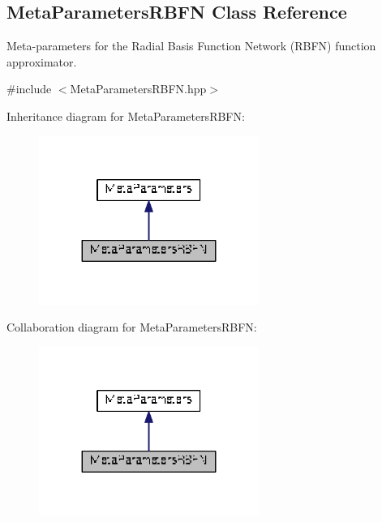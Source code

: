 \hypertarget{classDmpBbo_1_1MetaParametersRBFN}{\subsection{Meta\+Parameters\+R\+B\+F\+N Class Reference}
\label{classDmpBbo_1_1MetaParametersRBFN}
}


Meta-\/parameters for the Radial Basis Function Network (R\+B\+F\+N) function approximator.  




{\ttfamily \#include $<$Meta\+Parameters\+R\+B\+F\+N.\+hpp$>$}



Inheritance diagram for Meta\+Parameters\+R\+B\+F\+N\+:
\nopagebreak
\begin{figure}[H]
\begin{center}
\leavevmode
\includegraphics[width=203pt]{classDmpBbo_1_1MetaParametersRBFN__inherit__graph}
\end{center}
\end{figure}


Collaboration diagram for Meta\+Parameters\+R\+B\+F\+N\+:
\nopagebreak
\begin{figure}[H]
\begin{center}
\leavevmode
\includegraphics[width=203pt]{classDmpBbo_1_1MetaParametersRBFN__coll__graph}
\end{center}
\end{figure}
